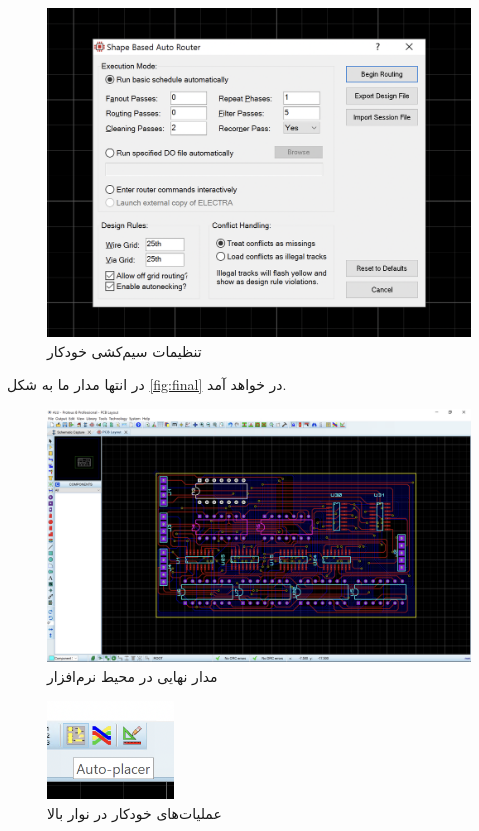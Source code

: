 \begin{figure}[h!]
    \centering
    \includegraphics[width=\textwidth]{images/ALU-PCB-AutoConnection.png}
    \caption{
    تنظیمات سیم‌کشی خودکار
    }
    \label{fig:wire}
\end{figure}

در انتها مدار ما به شکل
\eqref{fig:final}
در خواهد آمد.

\begin{figure}[h!]
    \centering
    \includegraphics[width=\textwidth]{images/ALU-PCB-PR.png}
    \caption{
    مدار نهایی در محیط نرم‌افزار
    }
    \label{fig:final}
\end{figure}

\begin{figure}[h!]
    \centering
    \includegraphics[width=0.3\textwidth]{images/ALU-PCB-AutoPlacer.png}
    \caption{
    عملیات‌های خودکار در نوار بالا
    }
\end{figure}

